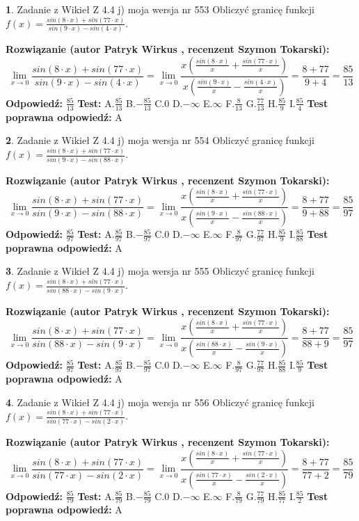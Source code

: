 \documentclass[12pt, a4paper]{article}
\theoremstyle{definition} %
\newtheorem{zad}{}
\newcommand{\zadStart}[1]{\begin{zad}#1\newline}
\newcommand{\zadStop}{\end{zad}}
\newcommand{\rozwStart}[2]{\noindent \textbf{Rozwiązanie (autor #1 , recenzent #2): }\newline}
\newcommand{\rozwStop}{\newline}
\newcommand{\odpStart}{\noindent \textbf{Odpowiedź:}\newline}
\newcommand{\odpStop}{\newline}
\newcommand{\testStart}{\noindent \textbf{Test:}\newline}
\newcommand{\testStop}{\newline}
\newcommand{\kluczStart}{\noindent \textbf{Test poprawna odpowiedź:}\newline}
\newcommand{\kluczStop}{\newline}
\begin{document}
\zadStart{Zadanie z Wikieł Z 4.4 j) moja wersja nr 553}
Obliczyć granicę funkcji $f(x)=\frac{sin(8\cdot x) +sin(77\cdot x)}{sin(9\cdot x) -sin(4\cdot x)}$.
\zadStop
\rozwStart{Patryk Wirkus}{Szymon Tokarski}
$$\lim\limits_{x\to 0}\frac{sin(8\cdot x) +sin(77\cdot x)}{sin(9\cdot x) -sin(4\cdot x)}=\lim\limits_{x\to 0}\frac{x(\frac{sin(8\cdot x)}{x}+\frac{sin(77\cdot x)}{x})}{x(\frac{sin(9\cdot x)}{x}-\frac{sin(4\cdot x)}{x})}=\frac{8+77}{9+4} = \frac{85}{13}$$
\rozwStop
\odpStart
$\frac{85}{13}$
\odpStop
\testStart
A.$\frac{85}{13}$
B.$-\frac{85}{13}$
C.$0$
D.$-\infty$
E.$\infty$
F.$\frac{8}{13}$
G.$\frac{77}{13}$
H.$\frac{85}{9}$
I.$\frac{85}{4}$
\testStop
\kluczStart
A
\kluczStop



\zadStart{Zadanie z Wikieł Z 4.4 j) moja wersja nr 554}
Obliczyć granicę funkcji $f(x)=\frac{sin(8\cdot x) +sin(77\cdot x)}{sin(9\cdot x) -sin(88\cdot x)}$.
\zadStop
\rozwStart{Patryk Wirkus}{Szymon Tokarski}
$$\lim\limits_{x\to 0}\frac{sin(8\cdot x) +sin(77\cdot x)}{sin(9\cdot x) -sin(88\cdot x)}=\lim\limits_{x\to 0}\frac{x(\frac{sin(8\cdot x)}{x}+\frac{sin(77\cdot x)}{x})}{x(\frac{sin(9\cdot x)}{x}-\frac{sin(88\cdot x)}{x})}=\frac{8+77}{9+88} = \frac{85}{97}$$
\rozwStop
\odpStart
$\frac{85}{97}$
\odpStop
\testStart
A.$\frac{85}{97}$
B.$-\frac{85}{97}$
C.$0$
D.$-\infty$
E.$\infty$
F.$\frac{8}{97}$
G.$\frac{77}{97}$
H.$\frac{85}{9}$
I.$\frac{85}{88}$
\testStop
\kluczStart
A
\kluczStop



\zadStart{Zadanie z Wikieł Z 4.4 j) moja wersja nr 555}
Obliczyć granicę funkcji $f(x)=\frac{sin(8\cdot x) +sin(77\cdot x)}{sin(88\cdot x) -sin(9\cdot x)}$.
\zadStop
\rozwStart{Patryk Wirkus}{Szymon Tokarski}
$$\lim\limits_{x\to 0}\frac{sin(8\cdot x) +sin(77\cdot x)}{sin(88\cdot x) -sin(9\cdot x)}=\lim\limits_{x\to 0}\frac{x(\frac{sin(8\cdot x)}{x}+\frac{sin(77\cdot x)}{x})}{x(\frac{sin(88\cdot x)}{x}-\frac{sin(9\cdot x)}{x})}=\frac{8+77}{88+9} = \frac{85}{97}$$
\rozwStop
\odpStart
$\frac{85}{97}$
\odpStop
\testStart
A.$\frac{85}{97}$
B.$-\frac{85}{97}$
C.$0$
D.$-\infty$
E.$\infty$
F.$\frac{8}{97}$
G.$\frac{77}{97}$
H.$\frac{85}{88}$
I.$\frac{85}{9}$
\testStop
\kluczStart
A
\kluczStop



\zadStart{Zadanie z Wikieł Z 4.4 j) moja wersja nr 556}
Obliczyć granicę funkcji $f(x)=\frac{sin(8\cdot x) +sin(77\cdot x)}{sin(77\cdot x) -sin(2\cdot x)}$.
\zadStop
\rozwStart{Patryk Wirkus}{Szymon Tokarski}
$$\lim\limits_{x\to 0}\frac{sin(8\cdot x) +sin(77\cdot x)}{sin(77\cdot x) -sin(2\cdot x)}=\lim\limits_{x\to 0}\frac{x(\frac{sin(8\cdot x)}{x}+\frac{sin(77\cdot x)}{x})}{x(\frac{sin(77\cdot x)}{x}-\frac{sin(2\cdot x)}{x})}=\frac{8+77}{77+2} = \frac{85}{79}$$
\rozwStop
\odpStart
$\frac{85}{79}$
\odpStop
\testStart
A.$\frac{85}{79}$
B.$-\frac{85}{79}$
C.$0$
D.$-\infty$
E.$\infty$
F.$\frac{8}{79}$
G.$\frac{77}{79}$
H.$\frac{85}{77}$
I.$\frac{85}{2}$
\testStop
\kluczStart
A
\kluczStop
\end{document}
